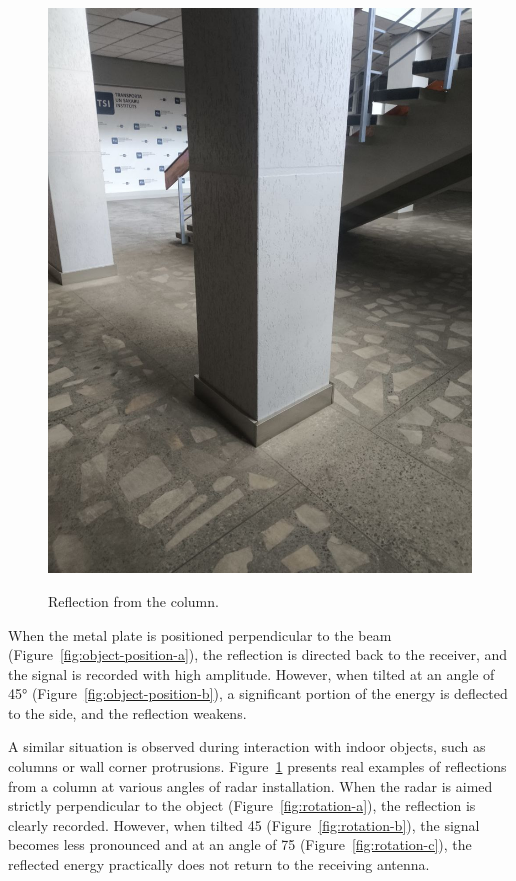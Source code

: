 \begin{figure}[H]
\begin{minipage}[b]{0.3\linewidth}
        \includegraphics[width=\linewidth]{Src/images/photo_5906680020825392809_y.jpg}
        \label{fig:rotation-c}
    \end{minipage}
    \caption{Reflection from the column.}
    \label{fig:object-rotation}
\end{figure}
 When the metal plate is positioned perpendicular to the beam (Figure~\ref{fig:object-position-a}), the reflection is directed back to the receiver, and the signal is recorded with high amplitude. However, when tilted at an angle of 45° (Figure~\ref{fig:object-position-b}), a significant portion of the energy is deflected to the side, and the reflection weakens.
 
A similar situation is observed during interaction with indoor objects, such as columns or wall corner protrusions. Figure~\ref{fig:object-rotation} presents real examples of reflections from a column at various angles of radar installation. When the radar is aimed strictly perpendicular to the object (Figure~\ref{fig:rotation-a}), the reflection is clearly recorded. However, when tilted 45 \degree (Figure~\ref{fig:rotation-b}), the signal becomes less pronounced and at an angle of 75 \degree (Figure~\ref{fig:rotation-c}), the reflected energy practically does not return to the receiving antenna.

